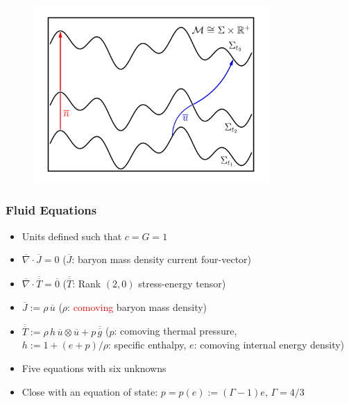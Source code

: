 \documentclass{beamer}
\newcommand{\red}{\textcolor{red}}
\newcommand{\ol}{\overline}
\begin{document}
\begin{frame}

  \begin{figure}[htb!]
    \centering
    \includegraphics[width=0.8\textwidth]{1+1b.png}
  \end{figure}

\end{frame}

\begin{frame}
\frametitle{Fluid Equations}

  \begin{itemize}[<+->]
    \item[]
      Units defined such that $c=G=1$\\[1em]
    \item[]
      $\ol{\nabla}\cdot\ol{J}=0$\hspace{1em}
      ($\ol{J}$: baryon mass density current four-vector)
    \item[]
      $\ol{\nabla}\cdot\ol{\ol{T}}=\ol{0}$\hspace{1em}
      ($\ol{\ol{T}}$: Rank $\left(2,0\right)$ stress-energy tensor)\\[1em]
    \item[]
      $\ol{J}:=\rho\,\ol{u}$\hspace{1em}
      ($\rho$: \red{comoving} baryon mass density)\\[1em]
    \item[]
      $\ol{\ol{T}}:=\rho\,h\,\ol{u}\otimes\ol{u}+p\,\ol{\ol{g}}$\hspace{1em}
      ($p$: comoving thermal pressure,\\[0.5em]
      $h:=1+\left(e+p\right)/\rho$: specific enthalpy,
      $e$: comoving internal energy density)\\[1em]
    \item[]
      Five equations with six unknowns \frownie{}\\[1em]
    \item[]
      Close with an equation of state:
      $p=p\left(e\right):=\left(\Gamma-1\right)e$,
      $\Gamma=4/3$
  \end{itemize}

\end{frame}
\end{document}
